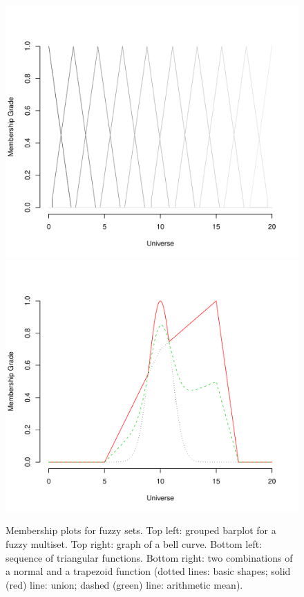 \documentclass[article]{jss}
\begin{document}
\begin{figure}[h]
\begin{center}
\includegraphics{JSS-plot3fig}
\hfill
\includegraphics{JSS-plot4fig}
\caption{Membership plots for fuzzy sets. Top left: grouped barplot
  for a fuzzy multiset. Top right: graph of a bell curve. Bottom left:
sequence of triangular functions. Bottom right: two combinations of a
normal and a trapezoid function (dotted lines: basic shapes;
solid (red) line: union; dashed (green) line: arithmetic mean).}
\label{fig:plots}
\end{center}
\end{figure}
\end{document}
